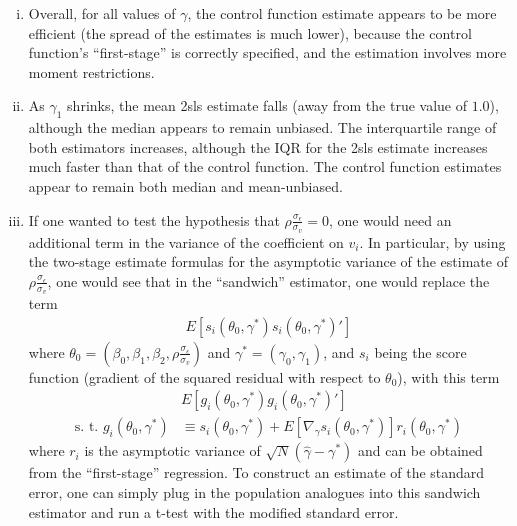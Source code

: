 \documentclass[11pt]{article}
\begin{document}
\begin{enumerate}[(a)]
	\begin{enumerate}[(i)]
	 
		\item Overall, for all values of $\gamma$, the control function estimate appears to be more efficient (the spread of the estimates is much lower), because the control function's ``first-stage'' is correctly specified, and the estimation involves more moment restrictions.
		
		\item As $\gamma_1$ shrinks, the mean 2sls estimate falls (away from the true value of $1.0$), although the median appears to remain unbiased. The interquartile range of both estimators increases, although the IQR for the 2sls estimate increases much faster than that of the control function. The control function estimates appear to remain both median and mean-unbiased.

		\item If one wanted to test the hypothesis that $\rho \frac{\sigma_{\epsilon}}{\sigma_{v}} = 0$, one would need an additional term in the variance of the coefficient on $v_i$. In particular, by using the two-stage estimate formulas for the asymptotic variance of the estimate of $\rho \frac{\sigma_{\epsilon}}{\sigma_{v}}$, one would see that in the ``sandwich'' estimator, one would replace the term
		\begin{align*}
			E[s_i(\theta_0, \gamma^*)s_i(\theta_0, \gamma^*)']
		\end{align*}
		where $\theta_0 = (\beta_0, \beta_1, \beta_2, \rho \frac{\sigma_{\epsilon}}{\sigma_{v}})$ and $\gamma^* = (\gamma_0, \gamma_1)$, and $s_i$ being the score function (gradient of the squared residual with respect to $\theta_0$), with this term
		\begin{align*}
			& E[g_i(\theta_0, \gamma^*)g_i(\theta_0, \gamma^*)'] \\
			\mbox{s. t. } g_i(\theta_0, \gamma^*) &\equiv s_i(\theta_0, \gamma^*) + E \left[ \nabla_\gamma s_i(\theta_0, \gamma^*) \right]  r_i (\theta_0, \gamma^*)
		\end{align*}
		where $r_i$ is the asymptotic variance of $\sqrt{N}(\hat{\gamma} - \gamma^*)$ and can be obtained from the ``first-stage'' regression. To construct an estimate of the standard error, one can simply plug in the population analogues into this sandwich estimator and run a t-test with the modified standard error.

	\end{enumerate}

	\centering
	

\end{enumerate}
\end{document}
